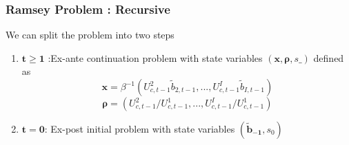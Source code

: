 \documentclass{beamer}
\begin{document}
\begin{frame}

\frametitle{Ramsey Problem : Recursive }

We can split the problem into two steps

\begin{enumerate}

\item $\mathbf{t\geq1}$ :Ex-ante continuation problem with state variables $(\bm{x},\bm{\rho},s\_)$  defined as 
\[\bm{x}= \beta^{-1}\left( U_{c,t-1}^{2}\tilde{b}_{2,t-1},...,U_{c,t-1}^{I}\tilde{b}_{I,t-1}\right)\]
\[ \bm{\rho }=\left( U_{c,t-1}^{2}/U_{c,t-1}^{1},...,U_{c,t-1}^{I}/U_{c,t-1}^{1}\right) \]
\item $\mathbf{t=0} $: Ex-post initial problem with state variables $(\bm{\tilde{b}_{-1}},s_{0})$
\end{enumerate}

\end{frame}
 
\end{document}
